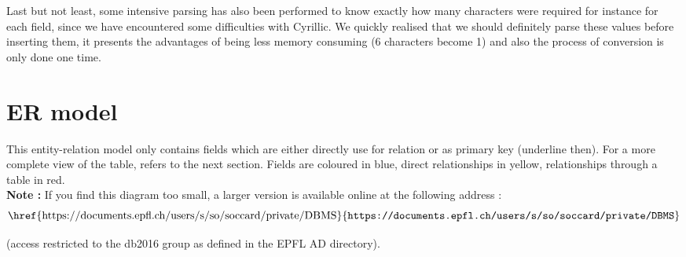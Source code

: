 \documentclass[doubleside, titlepage]{article}
\begin{document}
~\\~\\
Last but not least, some intensive parsing has also been performed to know exactly how many characters were required for instance for each field, since we have encountered some difficulties with Cyrillic. We quickly realised that we should definitely parse these values before inserting them, it presents the advantages of being less memory consuming (6 characters become 1) and also the process of conversion is only done one time.
\addtocounter{page}{1}

\section{ER model}

This entity-relation model only contains fields which are either directly use for relation or as primary key (underline then). For a more complete view of the table, refers to the next section. Fields are coloured in blue, direct relationships in yellow, relationships through a table in red.
~\\
\textbf{Note :} If you find this diagram too small, a larger version is available online at the following address : 
$$
\text{\href{https://documents.epfl.ch/users/s/so/soccard/private/DBMS}{\texttt{https://documents.epfl.ch/users/s/so/soccard/private/DBMS}}}
$$
\begin{flushright}
(access restricted to the db2016 group as defined in the EPFL AD directory).
\end{flushright}

\newpage
\end{document}
